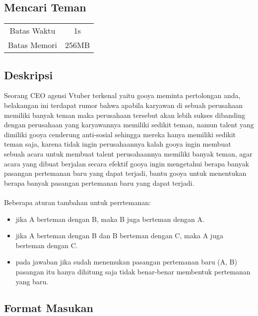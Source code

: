\documentclass{article}
\begin{document}
\begin{center}

    
    \section*{Mencari Teman} %

    \begin{tabular}{ | c c | }
        \hline
        Batas Waktu  & 1s \\    %
        Batas Memori & 256MB \\  %
        \hline
    \end{tabular}
\end{center}

\subsection*{Deskripsi}
Seorang CEO agensi Vtuber terkenal yaitu gooya meminta pertolongan anda, belakangan ini terdapat rumor bahwa apabila karyawan di sebuah perusahaan memiliki banyak teman maka perusahaan tersebut akan lebih sukses dibanding dengan perusahaan yang karyawannya memiliki sedikit teman, namun talent yang dimiliki gooya cenderung anti-sosial sehingga mereka hanya memiliki sedikit teman saja, karena tidak ingin perusahaannya kalah gooya ingin membuat sebuah acara untuk membuat talent perusahaannya memiliki banyak teman, agar acara yang dibuat berjalan secara efektif gooya ingin mengetahui berapa banyak pasangan pertemanan baru yang dapat terjadi, bantu gooya untuk menentukan berapa banyak pasangan pertemanan baru yang dapat terjadi.\\
\\
Beberapa aturan tambahan untuk perrtemanan:
\begin{itemize}
    \setlength\itemsep{0pt}
    \item jika A berteman dengan B, maka B juga berteman dengan A.
    \item jika A berteman dengan B dan B berteman dengan C, maka A juga berteman dengan C.
    \item pada jawaban jika sudah menemukan pasangan pertemanan baru (A, B) pasangan itu hanya dihitung saja tidak benar-benar membentuk pertemanan yang baru.
\end{itemize}

\subsection*{Format Masukan}
\end{document}
